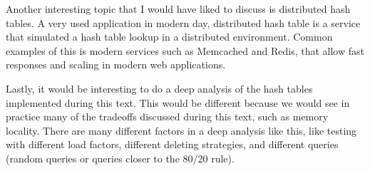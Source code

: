 Another interesting topic that I would have liked to discuss is distributed hash tables. A very used application in modern day, distributed hash table is a service that simulated a hash table lookup in a distributed environment. Common examples of this is modern services such as Memcached and Redis, that allow fast responses and scaling in modern web applications.

Lastly, it would be interesting to do a deep analysis of the hash tables implemented during this text. This would be different because we would see in practice many of the tradeoffs discussed during this text, such as memory locality. There are many different factors in a deep analysis like this, like testing with different load factors, different deleting strategies, and different queries (random queries or queries closer to the 80/20 rule).
